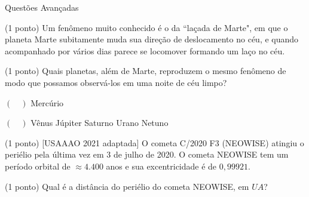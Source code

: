 \documentclass{../lista}
\begin{document}
	\begin{secao}{Questões Avançadas}
		\begin{questao}{(1 ponto)}
			Um fenômeno muito conhecido é o da ``laçada de Marte", em que o planeta Marte subitamente muda sua direção de deslocamento no céu, e quando acompanhado por vários dias parece se locomover formando um laço no céu.
			
			\begin{pergunta}{(1 ponto)}
				Quais planetas, além de Marte, reproduzem o mesmo fenômeno de modo que possamos observá-los em uma noite de céu limpo?
				
				
				\begin{multicols}{3}
					\begin{alternativas}
						\item[$(\quad)$] Mercúrio
						\item[$(\quad)$] Vênus
						\alternativaMarcada Júpiter
						\alternativaMarcada Saturno
						\alternativaMarcada Urano
						\alternativaMarcada Netuno
					\end{alternativas}
				\end{multicols}
			\end{pergunta}
		\end{questao}
		
		\begin{questao}{(1 ponto) [USAAAO 2021 adaptada]}
			O cometa C/2020 F3 (NEOWISE) atingiu o periélio pela última vez em 3 de julho de 2020. O cometa NEOWISE tem um período orbital de $\approx 4.400$ anos e sua excentricidade é de $0,99921$.
			
			\begin{pergunta}{(1 ponto)}
				Qual é a distância do periélio do cometa NEOWISE, em $UA$?
				
				

\end{pergunta}
\end{questao}
\end{secao}
\end{document}

